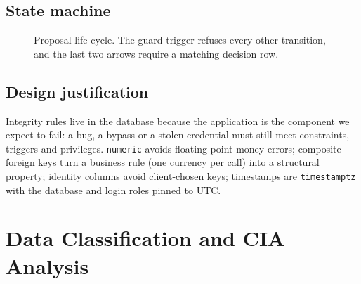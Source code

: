 \documentclass[10pt,a4paper]{article}
\newcommand{\code}[1]{\nolinkurl{#1}}
\begin{document}
\subsection{State machine}
\begin{figure}[H]\centering
{}
\caption{Proposal life cycle. The guard trigger refuses every other transition, and the last two arrows require a matching decision row.}
\end{figure}

\subsection{Design justification}
Integrity rules live in the database because the application is the component we expect to fail: a bug, a bypass or a stolen credential must still meet constraints, triggers and privileges. \code{numeric} avoids floating-point money errors; composite foreign keys turn a business rule (one currency per call) into a structural property; identity columns avoid client-chosen keys; timestamps are \code{timestamptz} with the database and login roles pinned to UTC.
\section{Data Classification and CIA Analysis}\label{sec:class}
\end{document}
